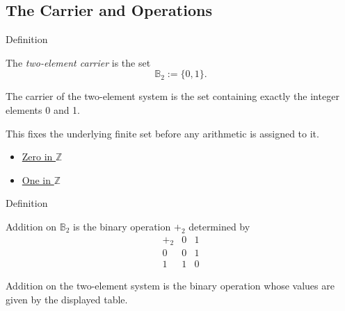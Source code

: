 \subsection*{The Carrier and Operations}

\begin{definitionbox}{Definition}
\begin{definition}
\label{def:two-element-carrier}
The \emph{two-element carrier} is the set
\[
\mathbb{B}_2:=\{0,1\}.
\]
\end{definition}
\end{definitionbox}

\begin{remark*}
The carrier of the two-element system is the set containing exactly the integer elements 0 and 1.
\end{remark*}

\begin{remark*}[Interpretation]
This fixes the underlying finite set before any arithmetic is assigned to it.
\end{remark*}

\begin{dependencies}
\begin{itemize}
  \item \hyperref[def:zero-in-z]{Zero in \(\mathbb{Z}\)}
  \item \hyperref[def:one-in-z]{One in \(\mathbb{Z}\)}
\end{itemize}
\end{dependencies}

\begin{definitionbox}{Definition}
\begin{definition}
\label{def:addition-on-two-element-system}
Addition on \(\mathbb{B}_2\) is the binary operation \(+_2\) determined by
\[
\begin{array}{c|cc}
+_2 & 0 & 1\\ \hline
0 & 0 & 1\\
1 & 1 & 0
\end{array}
\]
\end{definition}
\end{definitionbox}

\begin{remark*}
Addition on the two-element system is the binary operation whose values are given by the displayed table.
\end{remark*}

